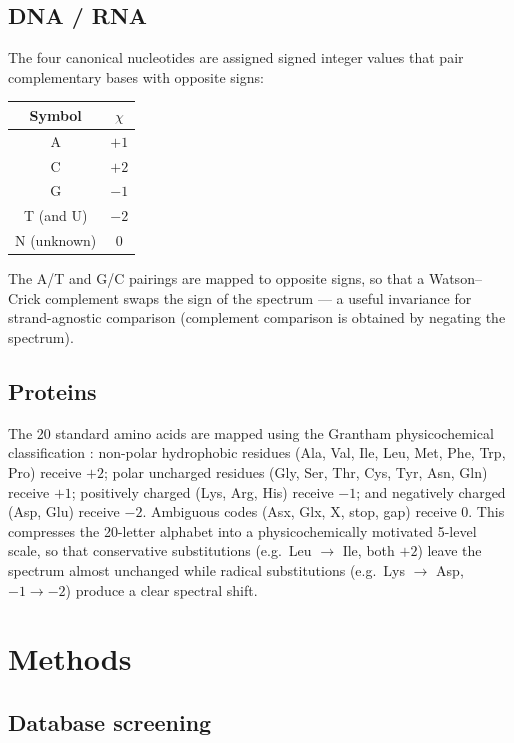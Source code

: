 \documentclass[12pt,a4paper]{article}
\begin{document}
\subsection{DNA / RNA}
\label{sec:dna}

The four canonical nucleotides are assigned signed integer values that
pair complementary bases with opposite signs:

\begin{center}
\begin{tabular}{c|c}
Symbol & $\chi$ \\
\midrule
A & $+1$ \\
C & $+2$ \\
G & $-1$ \\
T (and U) & $-2$ \\
N (unknown) & $0$
\end{tabular}
\end{center}

The A/T and G/C pairings are mapped to opposite signs, so that a
Watson--Crick complement swaps the sign of the spectrum --- a useful
invariance for strand-agnostic comparison (complement comparison is
obtained by negating the spectrum).

\subsection{Proteins}
\label{sec:protein}

The 20 standard amino acids are mapped using the Grantham
physicochemical classification \cite{grantham1974aminoacid}: non-polar
hydrophobic residues (Ala, Val, Ile, Leu, Met, Phe, Trp, Pro) receive
$+2$; polar uncharged residues (Gly, Ser, Thr, Cys, Tyr, Asn, Gln)
receive $+1$; positively charged (Lys, Arg, His) receive $-1$; and
negatively charged (Asp, Glu) receive $-2$. Ambiguous codes (Asx, Glx,
X, stop, gap) receive $0$. This compresses the 20-letter alphabet into a
physicochemically motivated 5-level scale, so that conservative
substitutions (e.g.\ Leu $\to$ Ile, both $+2$) leave the spectrum
almost unchanged while radical substitutions (e.g.\ Lys $\to$ Asp,
$-1 \to -2$) produce a clear spectral shift.

\section{Methods}
\label{sec:methods}

\subsection{Database screening}
\label{sec:screen}
\end{document}
